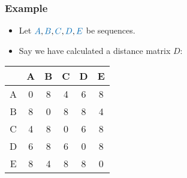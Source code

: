 \documentclass[usenames,dvipsnames,xcolor=table]{beamer}
\begin{document}
\begin{frame}
  \frametitle{Example}
  \begin{itemize}
    \item Let $\textcolor{ALUblue}{A},\textcolor{ALUblue}{B},\textcolor{ALUblue}{C},\textcolor{ALUblue}{D},\textcolor{ALUblue}{E}$ be sequences.
    \item Say we have calculated a distance matrix $D$:
  \end{itemize}
  \begin{table}[]
  \centering
  \begin{tabular}{c|c|c|c|c|c|}
  \cline{2-6}
                          & A & B & C & D & E \\ \hline
  \multicolumn{1}{|c|}{A} & 0 & 8 & 4 & 6 & 8 \\ \hline
  \multicolumn{1}{|c|}{B} & 8 & 0 & 8 & 8 & 4 \\ \hline
  \multicolumn{1}{|c|}{C} & 4 & 8 & 0 & 6 & 8 \\ \hline
  \multicolumn{1}{|c|}{D} & 6 & 8 & 6 & 0 & 8 \\ \hline
  \multicolumn{1}{|c|}{E} & 8 & 4 & 8 & 8 & 0 \\ \hline
  \end{tabular}
  \end{table}
\end{frame}
\end{document}
